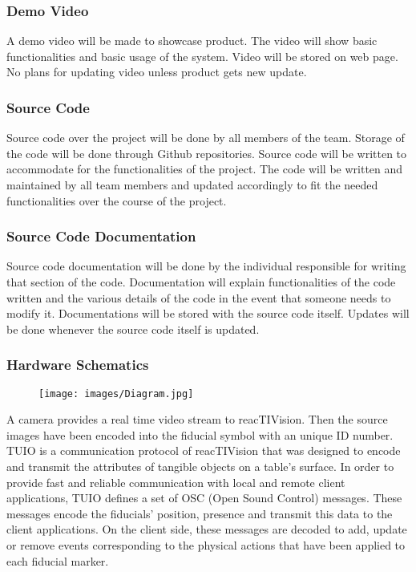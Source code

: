 \subsubsection{Demo Video}
A demo video will be made to showcase product. The video will show basic functionalities and basic usage of the system. Video will be stored on web page. No plans for updating video unless product gets new update. 

\subsubsection{Source Code}
Source code over the project will be done by all members of the team. Storage of the code will be done through Github repositories. Source code will be written to accommodate for the functionalities of the project. The code will be written and maintained by all team members and updated accordingly to fit the needed functionalities over the course of the project. 

\subsubsection{Source Code Documentation}
Source code documentation will be done by the individual responsible for writing that section of the code. Documentation will explain functionalities of the code written and the various details of the code in the event that someone needs to modify it. Documentations will be stored with the source code itself. Updates will be done whenever the source code itself is updated. 

\subsubsection{Hardware Schematics}
\begin{figure}[h!]
    \centering
    \texttt{[image: images/Diagram.jpg]}
\end{figure}
A camera provides a real time video stream to reacTIVision. Then the source images have been encoded into the fiducial symbol with an unique ID number. TUIO is a communication protocol of reacTIVision that was designed to encode and transmit the attributes of tangible objects on a table's surface. In order to provide fast and reliable communication with local and remote client applications, TUIO defines a set of OSC (Open Sound Control) messages. These messages encode the fiducials' position, presence and transmit this data to the client applications. On the client side, these messages are decoded to add, update or remove events corresponding to the physical actions that have been applied to each fiducial marker.

